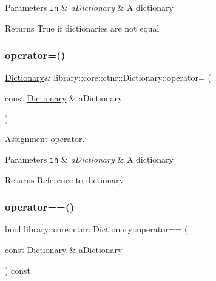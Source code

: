 \begin{DoxyParams}[1]{Parameters}
\mbox{\tt in}  & {\em a\+Dictionary} & A dictionary \\
\hline
\end{DoxyParams}
\begin{DoxyReturn}{Returns}
True if dictionaries are not equal 
\end{DoxyReturn}
\mbox{\label{classlibrary_1_1core_1_1ctnr_1_1Dictionary_abb23ad41d33d3e89e55d0fb831b8fac3}} 
\subsubsection{\texorpdfstring{operator=()}{operator=()}}
{\footnotesize\ttfamily \hyperlink{classlibrary_1_1core_1_1ctnr_1_1Dictionary}{Dictionary}\& library\+::core\+::ctnr\+::\+Dictionary\+::operator= (\begin{DoxyParamCaption}\item[{const \hyperlink{classlibrary_1_1core_1_1ctnr_1_1Dictionary}{Dictionary} \&}]{a\+Dictionary }\end{DoxyParamCaption})}



Assignment operator. 


\begin{DoxyParams}[1]{Parameters}
\mbox{\tt in}  & {\em a\+Dictionary} & A dictionary \\
\hline
\end{DoxyParams}
\begin{DoxyReturn}{Returns}
Reference to dictionary 
\end{DoxyReturn}
\mbox{\label{classlibrary_1_1core_1_1ctnr_1_1Dictionary_ab4d5377a537b57f061a2a56e9bd86b47}} 
\subsubsection{\texorpdfstring{operator==()}{operator==()}}
{\footnotesize\ttfamily bool library\+::core\+::ctnr\+::\+Dictionary\+::operator== (\begin{DoxyParamCaption}\item[{const \hyperlink{classlibrary_1_1core_1_1ctnr_1_1Dictionary}{Dictionary} \&}]{a\+Dictionary }\end{DoxyParamCaption}) const}



